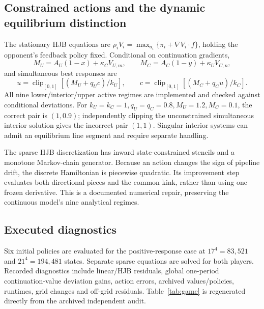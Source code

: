 \documentclass[11pt]{article}
\newcommand{\clip}{\operatorname{clip}_{[0,1]}}
\begin{document}
\subsection{Constrained actions and the dynamic equilibrium distinction}
The stationary HJB equations are $\rho_iV_i=\max_{a_i}\{\pi_i+\nabla V_i\cdot f\}$, holding the opponent's feedback policy fixed. Conditional on continuation gradients,
\begin{equation}
 M_U=A_U(1-x)+\kappa_CV_{U,m},\qquad M_C=A_C(1-y)+\kappa_UV_{C,n},
\end{equation}
and simultaneous best responses are
\begin{equation}
 u=\clip[(M_U+q_Uc)/k_U],\qquad c=\clip[(M_C+q_Cu)/k_C].
\end{equation}
All nine lower/interior/upper active regimes are implemented and checked against conditional deviations. For $k_U=k_C=1,q_U=q_C=0.8,M_U=1.2,M_C=0.1$, the correct pair is $(1,0.9)$; independently clipping the unconstrained simultaneous interior solution gives the incorrect pair $(1,1)$. Singular interior systems can admit an equilibrium line segment and require separate handling.

The sparse HJB discretization has inward state-constrained stencils and a monotone Markov-chain generator. Because an action changes the sign of pipeline drift, the discrete Hamiltonian is piecewise quadratic. Its improvement step evaluates both directional pieces and the common kink, rather than using one frozen derivative. This is a documented numerical repair, preserving the continuous model's nine analytical regimes.

\subsection{Executed diagnostics}
Six initial policies are evaluated for the positive-response case at $17^4=83{,}521$ and $21^4=194{,}481$ states. Separate sparse equations are solved for both players. Recorded diagnostics include linear/HJB residuals, global one-period continuation-value deviation gains, action errors, archived values/policies, runtimes, grid changes and off-grid residuals. Table~\ref{tab:game} is regenerated directly from the archived independent audit.

\begin{table}[htbp]\centering\small

\caption{Hypothetical finite-grid diagnostics. For each scenario/mesh the displayed errors are maxima across saved starts or methods. Candidate labels apply only to the finite-state approximation.}\label{tab:game}
\end{table}
\end{document}
